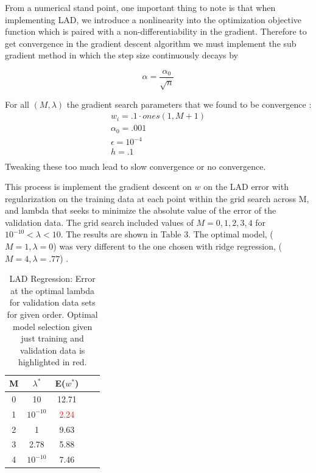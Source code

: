 \documentclass[10pt,twocolumn]{article}
\begin{document}
From a numerical stand point, one important thing to note is that when implementing LAD, we introduce a nonlinearity into the optimization objective function which is paired with a non-differentiability in the gradient. Therefore to get convergence in the gradient descent algorithm we must implement the sub gradient method in which the step size continuously decays by 

\begin{equation}
\alpha= \frac{\alpha_0 }{\sqrt{n}}
\end{equation}

For all $(M, \lambda)$ the gradient search parameters  that we found to be  convergence : 
\begin{align}
w_i =.1 \cdot ones(1, M+1) \\
\alpha_0 = .001 \\
\epsilon = 10^{-4} \\
h = .1 \\ 
\end{align}
Tweaking these too much lead to slow convergence or no convergence. 

This process is implement the gradient descent on $w$ on the LAD error with regularization on the training data at each point within the grid search across M, and lambda that seeks to minimize the absolute value of the error of the validation data. The grid search included values of $M= {0,1,2,3,4}$  for $10^{-10} < \lambda <10 $. The results are shown in  Table 3. The optimal model, ($M=1, \lambda = 0$) was very different to the one chosen with ridge regression, ($M=4, \lambda=.77$) .
\begin{table}
\begin{center}
  \begin{tabular}{ | c | c | c | c | c | }
    \hline
     M & $\lambda ^*$  & E($w^*$) \\ \hline
     0 & 10 & 12.71  \\ \hline
     1 & $ 10^{-10}$ & \textcolor{red}{2.24}   \\ \hline
     2 & 1 & 9.63   \\ \hline
     3 & 2.78 & 5.88   \\ \hline
     4 & $10^{-10}$ & 7.46   \\ \hline
    
    \hline
  \end{tabular}
  \caption{LAD Regression: Error at the optimal lambda for validation data sets for given order. Optimal model selection given just training and validation data is highlighted in red. }
\end{center}
\label{table:ave_sse}
\end{table}
\end{document}
